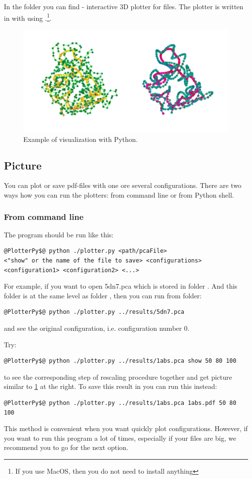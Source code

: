 \documentclass[12pt]{article}
\begin{document}
\begin{mySection}\label{sec:python}
In the folder  you can find  - interactive 3D plotter for  files.
The plotter is written in  with using .\footnote{If you use MacOS, then you do not need to install anything}. 

\begin{figure}[H]
	\centering
	\vskip -0cm 
  	\includegraphics[width=0.7\linewidth]{python.pdf}
  	\caption{Example of visualization with Python.}
	\label{fig:scaling}
\end{figure}
\subsection{Picture}
You can plot or save pdf-files with one ore several configurations. 
There are two ways how you can run the plotters: from command line or from Python shell.
\subsubsection{From command line}
The program should be run like this:
\begin{lstlisting}
@PlotterPy$@ python ./plotter.py <path/pcaFile> 
<"show" or the name of the file to save> <configurations>
<configuration1> <configuration2> <...>
\end{lstlisting}

For example, if you want to open 5dn7.pca which is stored in folder . And this folder  is at the same level as folder , then you can run from  folder:
\begin{lstlisting}
@PlotterPy$@ python ./plotter.py ../results/5dn7.pca
\end{lstlisting}
and see the original configuration, i.e. configuration number 0.

Try:
\begin{lstlisting}
@PlotterPy$@ python ./plotter.py ../results/1abs.pca show 50 80 100
\end{lstlisting}
to see the corresponding step of rescaling procedure together and get picture similar to \ref{fig:scaling} at the right.
To save this result in  you can run this instead:
\begin{lstlisting}
@PlotterPy$@ python ./plotter.py ../results/1abs.pca 1abs.pdf 50 80 100
\end{lstlisting}
This method is convenient when you want quickly plot configurations. However, if you want to run this program a lot of times, especially if your files are big, we recommend you to go for the next option.


\end{mySection}
\end{document}
